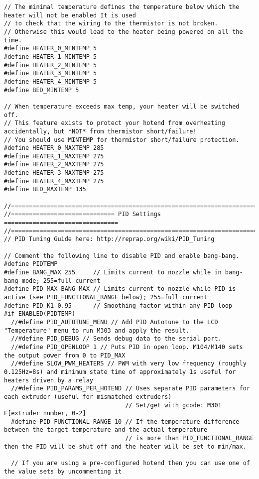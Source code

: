 \begin{lstlisting}[caption = キャプション, label = ラベル]
// The minimal temperature defines the temperature below which the heater will not be enabled It is used
// to check that the wiring to the thermistor is not broken.
// Otherwise this would lead to the heater being powered on all the time.
#define HEATER_0_MINTEMP 5
#define HEATER_1_MINTEMP 5
#define HEATER_2_MINTEMP 5
#define HEATER_3_MINTEMP 5
#define HEATER_4_MINTEMP 5
#define BED_MINTEMP 5

// When temperature exceeds max temp, your heater will be switched off.
// This feature exists to protect your hotend from overheating accidentally, but *NOT* from thermistor short/failure!
// You should use MINTEMP for thermistor short/failure protection.
#define HEATER_0_MAXTEMP 285
#define HEATER_1_MAXTEMP 275
#define HEATER_2_MAXTEMP 275
#define HEATER_3_MAXTEMP 275
#define HEATER_4_MAXTEMP 275
#define BED_MAXTEMP 135

//===========================================================================
//============================= PID Settings ================================
//===========================================================================
// PID Tuning Guide here: http://reprap.org/wiki/PID_Tuning

// Comment the following line to disable PID and enable bang-bang.
#define PIDTEMP
#define BANG_MAX 255     // Limits current to nozzle while in bang-bang mode; 255=full current
#define PID_MAX BANG_MAX // Limits current to nozzle while PID is active (see PID_FUNCTIONAL_RANGE below); 255=full current
#define PID_K1 0.95      // Smoothing factor within any PID loop
#if ENABLED(PIDTEMP)
  //#define PID_AUTOTUNE_MENU // Add PID Autotune to the LCD "Temperature" menu to run M303 and apply the result.
  //#define PID_DEBUG // Sends debug data to the serial port.
  //#define PID_OPENLOOP 1 // Puts PID in open loop. M104/M140 sets the output power from 0 to PID_MAX
  //#define SLOW_PWM_HEATERS // PWM with very low frequency (roughly 0.125Hz=8s) and minimum state time of approximately 1s useful for heaters driven by a relay
  //#define PID_PARAMS_PER_HOTEND // Uses separate PID parameters for each extruder (useful for mismatched extruders)
                                  // Set/get with gcode: M301 E[extruder number, 0-2]
  #define PID_FUNCTIONAL_RANGE 10 // If the temperature difference between the target temperature and the actual temperature
                                  // is more than PID_FUNCTIONAL_RANGE then the PID will be shut off and the heater will be set to min/max.

  // If you are using a pre-configured hotend then you can use one of the value sets by uncommenting it


\end{lstlisting}
